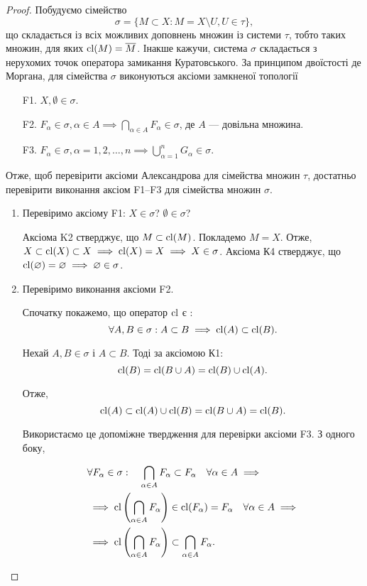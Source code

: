 \begin{proof}
Побудуємо сімейство \[\sigma = \{ M \subset X: M = X \setminus U, U \in \tau\}, \]
що складається із всіх можливих доповнень множин із
системи $\tau$, тобто таких множин, для яких $\operatorname{cl}(M) = \overline{M}$. Інакше
кажучи, система $\sigma$ складається з нерухомих точок оператора
замикання Куратовського. За принципом двоїстості де
Моргана, для сімейства $\sigma$ виконуються аксіоми замкненої
топології

\begin{enumerate}
\item[F1.] $X, \emptyset \in \sigma$.
\item[F2.] $F_\alpha \in \sigma, \alpha \in A \implies \bigcap_{\alpha \in A} F_\alpha \in \sigma$, де $A$ --- довільна множина.
\item[F3.] $F_\alpha \in \sigma, \alpha = 1, 2, \ldots, n \implies \bigcup_{\alpha = 1}^n G_\alpha \in \sigma$.
\end{enumerate}

Отже, щоб перевірити аксіоми Александрова для
сімейства множин $\tau$, достатньо перевірити виконання аксіом
F1--F3 для сімейства множин $\sigma$.

\begin{enumerate}
\item Перевіримо аксіому F1: $X \in \sigma$? $\emptyset \in \sigma$?

Аксіома K2 стверджує, що $M \subset \operatorname{cl}(M)$. Покладемо $M = X$.
Отже, $X \subset \operatorname{cl}(X) \subset X \implies \operatorname{cl}(X) = X \implies X \in \sigma$.
Аксіома К4 стверджує, що $\operatorname{cl}(\varnothing) = \varnothing \implies \varnothing \in \sigma$.

\item Перевіримо виконання аксіоми F2.

Спочатку покажемо, що оператор $\operatorname{cl}$ є :
\[\forall A, B \in \sigma: A \subset B \implies \operatorname{cl}(A) \subset \operatorname{cl}(B).\]

Нехай $A, B \in \sigma$ і $A \subset B$. Тоді за аксіомою К1:
\[ \operatorname{cl}(B) = \operatorname{cl}(B \cup A) = \operatorname{cl}(B) \cup \operatorname{cl}(A).\]

Отже, \[ \operatorname{cl}(A) \subset \operatorname{cl}(A) \cup \operatorname{cl}(B) = \operatorname{cl}(B \cup A) = \operatorname{cl}(B). \]

Використаємо це допоміжне твердження для перевірки
аксіоми F3. З одного боку,

\begin{align*}
& \forall F_\alpha \in \sigma: \quad \bigcap_{\alpha \in A} F_\alpha \subset F_\alpha \quad \forall \alpha \in A \implies \\
& \implies \operatorname{cl} \left(\bigcap_{\alpha \in A} F_\alpha \right) \in \operatorname{cl} (F_\alpha) = F_\alpha \quad \forall \alpha \in A \implies \\
& \implies \operatorname{cl} \left(\bigcap_{\alpha \in A} F_\alpha \right) \subset \bigcap_{\alpha \in A} F_\alpha.
\end{align*}


\end{enumerate}
\end{proof}
